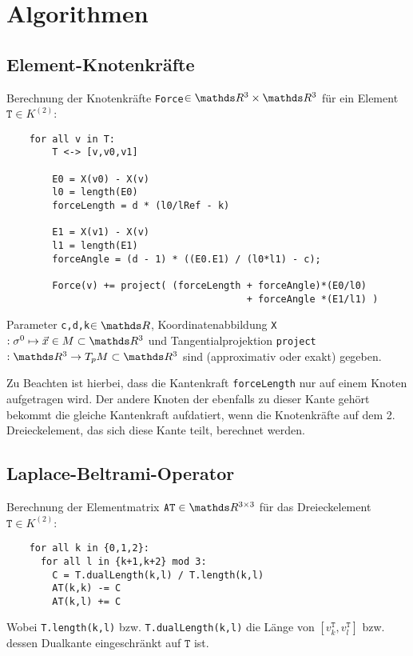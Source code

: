 \section{Algorithmen}
  
  
  \subsection{Element-Knotenkräfte}
    \label{AlgoForces}
    Berechnung der Knotenkräfte \texttt{Force}\( \in\R^{3}\times\R^{3} \) für ein Element 
    \(\mathtt{T} \in K^{(2)}\):

    \begin{verbatim}
    for all v in T:
        T <-> [v,v0,v1]
        
        E0 = X(v0) - X(v)
        l0 = length(E0)
        forceLength = d * (l0/lRef - k)

        E1 = X(v1) - X(v)
        l1 = length(E1)
        forceAngle = (d - 1) * ((E0.E1) / (l0*l1) - c);

        Force(v) += project( (forceLength + forceAngle)*(E0/l0) 
                                          + forceAngle *(E1/l1) ) 
    \end{verbatim}

    Parameter \texttt{c,d,k}\( \in\R \), 
    Koordinatenabbildung \texttt{X}\(: \sigma^{0} \mapsto \vec{x}\in M \subset \R^{3} \) 
    und Tangentialprojektion \texttt{project}\(: \R^{3} \rightarrow T_{p}M \subset \R^{3} \)
    sind (approximativ oder exakt) gegeben.

    Zu Beachten ist hierbei, dass die Kantenkraft \texttt{forceLength} nur auf einem Knoten aufgetragen wird.
    Der andere Knoten der ebenfalls zu dieser Kante gehört bekommt die gleiche Kantenkraft aufdatiert, wenn die Knotenkräfte auf dem 2. Dreieckelement, das sich diese Kante teilt, berechnet
    werden.

    
  \subsection{Laplace-Beltrami-Operator}
    \label{subsecAlgoLBeltrami}
    Berechnung der Elementmatrix \( \mathtt{AT}\in\R^{3\times 3} \) für das Dreieckelement
    \( \mathtt{T}\in K^{(2)} \):
    \begin{verbatim}
    for all k in {0,1,2}:
      for all l in {k+1,k+2} mod 3:
        C = T.dualLength(k,l) / T.length(k,l)
        AT(k,k) -= C
        AT(k,l) += C
    \end{verbatim}
    Wobei \texttt{T.length(k,l)} bzw. \texttt{T.dualLength(k,l)} die Länge von
    \( \left[ v^{\mathtt{T}}_{k} , v^{\mathtt{T}}_{l} \right] \) bzw. dessen Dualkante eingeschränkt auf \(
   \mathtt{T} \) ist.

